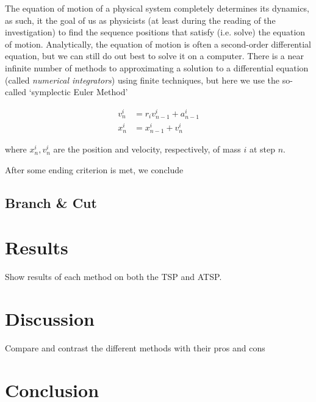 \documentclass{article}
\begin{document}
            The equation of motion of a physical system completely determines its dynamics, as such, it the goal of us as physicists (at least during the reading of the investigation) to find the sequence positions that satisfy (i.e. solve) the equation of motion.  Analytically, the equation of motion is often a second-order differential equation, but we can still do out best to solve it on a computer.  There is a near infinite number of methods to approximating a solution to a differential equation (called \emph{numerical integrators}) using finite techniques, but here we use the so-called `symplectic Euler Method'

            \begin{align}
                v_n^i &= r_i v_{n-1}^i + a_{n - 1}^i \\
                x_n^i &= x_{n - 1}^i + v_n^i
            \end{align}

            where $x_n^i, v_n^i$ are the position and velocity, respectively, of mass $i$ at step $n$.

            After some ending criterion is met, we conclude

        \subsection*{Branch \& Cut}

    \section*{Results}

        Show results of each method on both the TSP and ATSP.

    \section*{Discussion}

        Compare and contrast the different methods with their pros and cons

    \section*{Conclusion}

    \printbibliography
\end{document}
